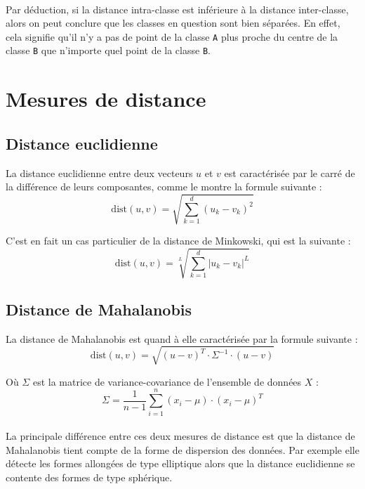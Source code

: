 \documentclass[french]{report}
\begin{document}
    \paragraph{}
    Par déduction, si la distance intra-classe est inférieure à la distance inter-classe, alors on peut conclure que les classes en question sont bien séparées.
    En effet, cela signifie qu'il n'y a pas de point de la classe \texttt{A} plus proche du centre de la classe \texttt{B} que n'importe quel point de la classe \texttt{B}.
    
    \section{Mesures de distance}
    
    \subsection{Distance euclidienne}
    La distance euclidienne entre deux vecteurs $u$ et $v$ est caractérisée par le carré de la différence de leurs composantes, comme le montre la formule suivante :
    \begin{equation}
        \mathrm{dist}(u,v)=\sqrt{\sum_{k=1}^d(u_k-v_k)^2}
    \end{equation}
    
    \noindent C'est en fait un cas particulier de la distance de Minkowski, qui est la suivante :
    \begin{equation}
        \mathrm{dist}(u,v)=\sqrt[L]{\sum_{k=1}^d|u_k-v_k|^L}
    \end{equation}
    
    
    \subsection{Distance de Mahalanobis}
    La distance de Mahalanobis est quand à elle caractérisée par la formule suivante :
    \begin{equation}
        \mathrm{dist}(u,v)=\sqrt{(u-v)^T\cdot\Sigma^{-1}\cdot(u-v)}
    \end{equation}
    
    \noindent Où $\Sigma$ est la matrice de variance-covariance de l'ensemble de données $X$ :
    \begin{equation}
        \Sigma=\frac1{n-1}\sum_{i=1}^n(x_i-\mu)\cdot(x_i-\mu)^T
    \end{equation}
    
    \paragraph{}
    La principale différence entre ces deux mesures de distance est que la distance de Mahalanobis tient compte de la forme de dispersion des données.
    Par exemple elle détecte les formes allongées de type elliptique alors que la distance euclidienne se contente des formes de type sphérique.
    
\end{document}
